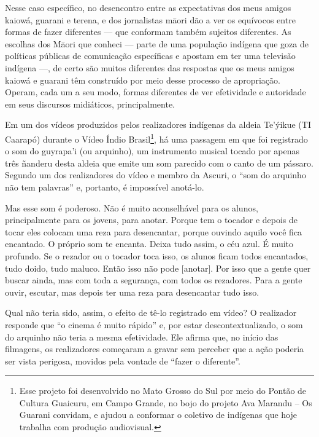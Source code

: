 \documentclass{article}
\begin{document}
Nesse caso espec\'ifico, no desencontro entre as expectativas dos meus
amigos kaiow\'a, guarani e terena, e dos jornalistas m\=aori d\~ao a
ver os equ\'ivocos entre formas de fazer diferentes --- que conformam
tamb\'em sujeitos diferentes. As escolhas dos M\=aori que conheci ---
parte de uma popula\c{c}\~ao ind\'igena que goza de pol\'iticas
p\'ublicas de comunica\c{c}\~ao espec\'ificas e apostam em ter uma
televis\~ao ind\'igena ---, de certo s\~ao muitos diferentes das
respostas que os meus amigos kaiow\'a e guarani t\^em constru\'ido por
meio desse processo de apropria\c{c}\~ao. Operam, cada um a seu modo,
formas diferentes de ver efetividade e autoridade em seus discursos
midi\'aticos, principalmente.

Em um dos v\'ideos produzidos pelos realizadores ind\'igenas da aldeia
Te{\textquoteright}\'yikue (TI Caarap\'o) durante o V\'ideo \'Indio
Brasil\footnote{ Esse projeto foi desenvolvido no Mato Grosso do Sul
por meio do Pont\~ao de Cultura Guaicuru, em Campo Grande, no bojo do
projeto Ava Marandu -- Os Guarani convidam, e ajudou a conformar o
coletivo de ind\'igenas que hoje trabalha com produ\c{c}\~ao
audiovisual.  }, h\'a uma passagem em que foi registrado o som do
guyrapa{\textquoteright}i (ou arquinho), um instrumento musical tocado
por apenas tr\^es \~nanderu desta aldeia que emite um som parecido com
o canto de um p\'assaro. Segundo um dos realizadores do v\'ideo e
membro da Ascuri, o {\textquotedblleft}som do arquinho n\~ao tem
palavras{\textquotedblright} e, portanto, \'e imposs\'ivel anot\'a-lo.

Mas esse som \'e poderoso. N\~ao \'e muito aconselh\'avel para os
alunos, principalmente para os jovens, para anotar. Porque tem o
tocador e depois de tocar eles colocam uma reza para desencantar,
porque ouvindo aquilo voc\^e fica encantado. O pr\'oprio som te
encanta. Deixa tudo assim, o c\'eu azul. \'E muito profundo. Se o
rezador ou o tocador toca isso, os alunos ficam todos encantados, tudo
doido, tudo maluco. Ent\~ao isso n\~ao pode [anotar]. Por isso que a
gente quer buscar ainda, mas com toda a seguran\c{c}a, com todos os
rezadores. Para a gente ouvir, escutar, mas depois ter uma reza para
desencantar tudo isso.

Qual n\~ao teria sido, assim, o efeito de t\^e-lo registrado em v\'ideo?
O realizador responde que {\textquotedblleft}o cinema \'e muito
r\'apido{\textquotedblright} e, por estar descontextualizado, o som do
arquinho n\~ao teria a mesma efetividade. Ele afirma que, no in\'icio
das filmagens, os realizadores come\c{c}aram a gravar sem perceber que
a a\c{c}\~ao poderia ser vista perigosa, movidos pela vontade de
{\textquotedblleft}fazer o diferente{\textquotedblright}.
\end{document}
